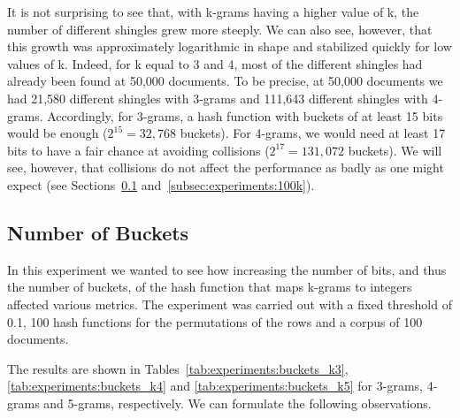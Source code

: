\documentclass[runningheads]{llncs}
\begin{document}
It is not surprising to see that, with k-grams having a higher value of k, the number of different shingles grew more steeply. We can also see, however, that this growth was approximately logarithmic in shape and stabilized quickly for low values of k. Indeed, for k equal to 3 and 4, most of the different shingles had already been found at 50,000 documents. To be precise, at 50,000 documents we had 21,580 different shingles with 3-grams and 111,643 different shingles with 4-grams. Accordingly, for 3-grams, a hash function with buckets of at least 15 bits would be enough ($2^{15} = 32,768$ buckets). For 4-grams, we would need at least 17 bits to have a fair chance at avoiding collisions ($2^{17} = 131,072$ buckets). We will see, however, that collisions do not affect the performance as badly as one might expect (see Sections~\ref{subsec:experiments:buckets} and~\ref{subsec:experiments:100k}).


\subsection{Number of Buckets}
\label{subsec:experiments:buckets}

In this experiment we wanted to see how increasing the number of bits, and thus the number of buckets, of the hash function that maps k-grams to integers affected various metrics. The experiment was carried out with a fixed threshold of 0.1, 100 hash functions for the permutations of the rows and a corpus of 100 documents.  

The results are shown in Tables~\ref{tab:experiments:buckets_k3}, \ref{tab:experiments:buckets_k4} and \ref{tab:experiments:buckets_k5} for 3-grams, 4-grams and 5-grams, respectively. We can formulate the following observations.
\end{document}
